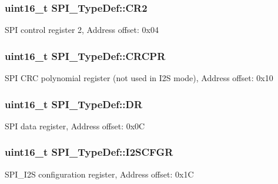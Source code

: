 \subsubsection[{\texorpdfstring{C\+R2}{CR2}}]{ uint16\+\_\+t S\+P\+I\+\_\+\+Type\+Def\+::\+C\+R2}\hypertarget{struct_s_p_i___type_def_ac891e34644b8dc27bacc906cfd18b235}{}\label{struct_s_p_i___type_def_ac891e34644b8dc27bacc906cfd18b235}
S\+PI control register 2, Address offset\+: 0x04 
\subsubsection[{\texorpdfstring{C\+R\+C\+PR}{CRCPR}}]{ uint16\+\_\+t S\+P\+I\+\_\+\+Type\+Def\+::\+C\+R\+C\+PR}\hypertarget{struct_s_p_i___type_def_a353c64e49ec9ae93b950668941f41175}{}\label{struct_s_p_i___type_def_a353c64e49ec9ae93b950668941f41175}
S\+PI C\+RC polynomial register (not used in I2S mode), Address offset\+: 0x10 
\subsubsection[{\texorpdfstring{DR}{DR}}]{ uint16\+\_\+t S\+P\+I\+\_\+\+Type\+Def\+::\+DR}\hypertarget{struct_s_p_i___type_def_ae192c943732b6ab5e5611e860cc05544}{}\label{struct_s_p_i___type_def_ae192c943732b6ab5e5611e860cc05544}
S\+PI data register, Address offset\+: 0x0C 
\subsubsection[{\texorpdfstring{I2\+S\+C\+F\+GR}{I2SCFGR}}]{ uint16\+\_\+t S\+P\+I\+\_\+\+Type\+Def\+::\+I2\+S\+C\+F\+GR}\hypertarget{struct_s_p_i___type_def_a20a4775ce461eec0d9a437bed464c0a5}{}\label{struct_s_p_i___type_def_a20a4775ce461eec0d9a437bed464c0a5}
S\+P\+I\+\_\+\+I2S configuration register, Address offset\+: 0x1C 

